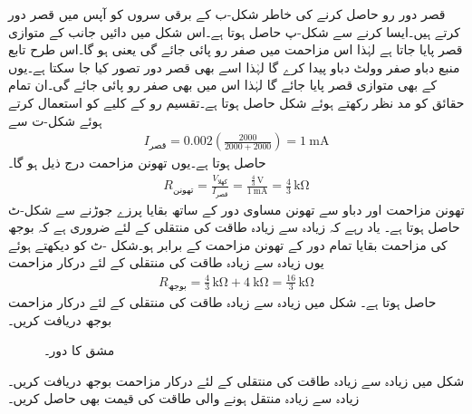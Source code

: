 قصر دور رو حاصل کرنے کی خاطر شکل-ب کے برقی سروں کو آپس میں قصر دور کرتے ہیں۔ایسا کرنے سے شکل-پ حاصل ہوتا ہے۔اس شکل میں دائیں جانب  کے متوازی قصر پایا جاتا ہے لہٰذا اس مزاحمت میں صفر رو پائی جائے گی  یعنی ہو گا۔اس طرح تابع منبع دباو صفر وولٹ دباو پیدا کرے گا لہٰذا اسے  بھی قصر دور  تصور کیا جا سکتا ہے۔یوں  کے بھی متوازی قصر پایا جائے گا لہٰذا اس میں بھی صفر رو پائی جائے گی۔ان تمام حقائق کو مد نظر رکھتے ہوئے شکل حاصل ہوتا ہے۔تقسیم رو کے کلیے کو استعمال کرتے ہوئے شکل-ت سے
\begin{align*}
I_{\text{قصر}} = 0.002\left(\frac{2000}{2000+2000}\right)=\SI{1}{\milli\ampere}
\end{align*}
حاصل ہوتا ہے۔یوں تھونن مزاحمت درج ذیل ہو گا۔
\begin{align*}
R_{\text{تھونن}}=\frac{V_{\text{کھلا}}}{I_{\text{قصر}}}=\frac{\frac{4}{3} \, \si{\volt}}{\SI{1}{\milli\ampere}}=\frac{4}{3}\, \si{\kilo\ohm}
\end{align*}
تھونن مزاحمت اور دباو سے تھونن مساوی دور کے ساتھ بقایا پرزے جوڑنے سے شکل-ٹ حاصل ہوتا ہے۔ یاد رہے کہ زیادہ سے زیادہ طاقت کی منتقلی کے لئے ضروری ہے کہ بوجھ کی مزاحمت بقایا تمام دور کے تھونن مزاحمت کے برابر ہو۔شکل -ٹ کو دیکھتے ہوئے یوں زیادہ سے زیادہ طاقت کی منتقلی کے لئے درکار مزاحمت
\begin{align*}
R_{\text{بوجھ}}=\frac{4}{3} \, \si{\kilo\ohm}+\SI{4}{\kilo\ohm}=\frac{16}{3}\, \si{\kilo\ohm}
\end{align*}
حاصل ہوتا ہے۔
شکل  میں زیادہ سے زیادہ طاقت کی منتقلی کے لئے درکار مزاحمت بوجھ دریافت کریں۔

\begin{figure}
\centering
{}
\caption{مشق  کا دور۔}
\label{شکل_مسئلہ_مشق_منتقلی_طاقت_الف}
\end{figure}

شکل  میں زیادہ سے زیادہ طاقت کی منتقلی کے لئے درکار مزاحمت بوجھ دریافت کریں۔زیادہ سے زیادہ منتقل ہونے والی طاقت کی قیمت بھی حاصل کریں۔

